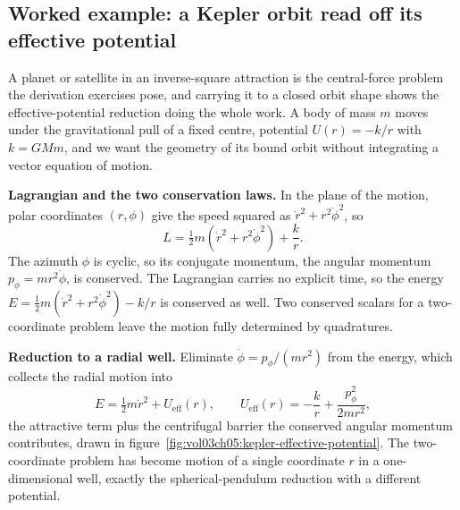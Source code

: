 \subsection{Worked example: a Kepler orbit read off its effective
potential}

A planet or satellite in an inverse-square attraction is the central-force
problem the derivation exercises pose, and carrying it to a closed orbit
shape shows the effective-potential reduction doing the whole work. A body
of mass $m$ moves under the gravitational pull of a fixed centre, potential
$U(r) = -k/r$ with $k = GMm$, and we want the geometry of its bound orbit
without integrating a vector equation of motion.

\textbf{Lagrangian and the two conservation laws.} In the plane of the
motion, polar coordinates $(r,\phi)$ give the speed squared as $\dot r^2 +
r^2\dot\phi^2$, so
\[
L = \tfrac12 m(\dot r^2 + r^2\dot\phi^2) + \frac{k}{r}.
\]
The azimuth $\phi$ is cyclic, so its conjugate momentum, the angular
momentum $p_\phi = mr^2\dot\phi$, is conserved. The Lagrangian carries no
explicit time, so the energy $E = \tfrac12 m(\dot r^2 + r^2\dot\phi^2) -
k/r$ is conserved as well. Two conserved scalars for a two-coordinate
problem leave the motion fully determined by quadratures.

\textbf{Reduction to a radial well.} Eliminate $\dot\phi = p_\phi/(mr^2)$
from the energy, which collects the radial motion into
\[
E = \tfrac12 m\dot r^2 + U_{\mathrm{eff}}(r),
\qquad
U_{\mathrm{eff}}(r) = -\frac{k}{r} + \frac{p_\phi^2}{2mr^2},
\]
the attractive term plus the centrifugal barrier the conserved angular
momentum contributes, drawn in
figure~\ref{fig:vol03ch05:kepler-effective-potential}. The two-coordinate
problem has become motion of a single coordinate $r$ in a one-dimensional
well, exactly the spherical-pendulum reduction with a different potential.

